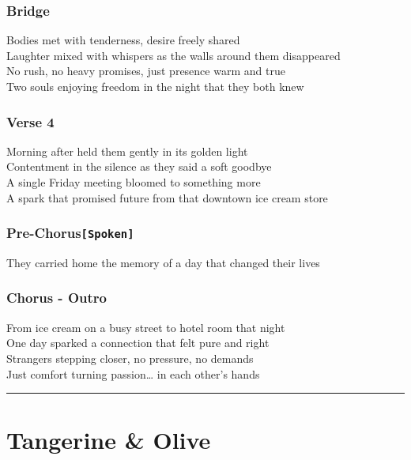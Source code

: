 \subsubsection{Bridge}\label{bridge-18}

Bodies met with tenderness, desire freely shared\\
Laughter mixed with whispers as the walls around them disappeared\\
No rush, no heavy promises, just presence warm and true\\
Two souls enjoying freedom in the night that they both knew

\subsubsection{Verse 4}\label{verse-4-4}

Morning after held them gently in its golden light\\
Contentment in the silence as they said a soft goodbye\\
A single Friday meeting bloomed to something more\\
A spark that promised future from that downtown ice cream store

\subsubsection{\texorpdfstring{Pre-Chorus\texttt{{[}Spoken{]}}}{Pre-Chorus{[}Spoken{]}}}\label{pre-chorusspoken-2}

They carried home the memory of a day that changed their lives

\subsubsection{Chorus - Outro}\label{chorus---outro}

From ice cream on a busy street to hotel room that night\\
One day sparked a connection that felt pure and right\\
Strangers stepping closer, no pressure, no demands\\
Just comfort turning passion\ldots{} in each other's hands

\begin{center}\rule{0.5\linewidth}{0.5pt}\end{center}

\section{Tangerine \& Olive}\label{tangerine-olive}


